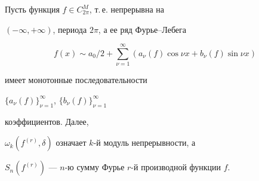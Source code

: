 \date{}







\pagestyle{plain} %













\maketitle


\label{begin}








Пусть функция $f\in C^M_{2\pi}$, т.\,е. непрерывна на


$(-\infty,+\infty)$, периода $2\pi$, а ее ряд Фурье--Лебега


\begin{equation}


f(x)\sim a_0/2+\sum^\infty_{\nu=1}


(a_\nu(f)\cos\nu x+b_\nu(f)\sin \nu x)


\end{equation}


имеет монотонные последовательности


$\{a_\nu(f)\}^\infty_{\nu=1}$, $\{b_\nu(f)\}^\infty_{\nu=1}$


коэффициентов. Далее,


$\omega_k(f^{(r)},\delta)$ означает $k$-й модуль непрерывности, а


$S_n(f^{(r)})$ --- $n$-ю сумму Фурье $r$-й производной функции $f$.





